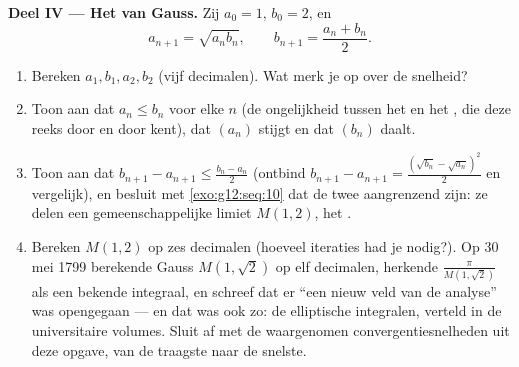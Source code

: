 \begin{problem}
\medskip
\noindent\textbf{Deel IV --- Het   van
Gauss.}
Zij $a_0 = 1$, $b_0 = 2$, en
\[
a_{n+1} = \sqrt{a_n b_n},
\qquad
b_{n+1} = \frac{a_n + b_n}{2} .
\]
\begin{enumerate}[resume]
  \item Bereken $a_1, b_1, a_2, b_2$ (vijf decimalen). Wat merk je op over de
        snelheid?
  \item Toon aan dat $a_n \leq b_n$ voor elke $n$ (de ongelijkheid tussen het
         en het  , die deze reeks door en door
        kent), dat $(a_n)$ stijgt en dat $(b_n)$ daalt.
  \item Toon aan dat $b_{n+1} - a_{n+1} \leq \frac{b_n - a_n}{2}$ (ontbind
        $b_{n+1} - a_{n+1} = \frac{(\sqrt{b_n} - \sqrt{a_n})^2}{2}$ en
        vergelijk), en besluit met \cref{exo:g12:seq:10} dat de twee 
        aangrenzend zijn: ze delen een gemeenschappelijke limiet $M(1, 2)$,
        het \emph{ }.
  \item Bereken $M(1, 2)$ op zes decimalen (hoeveel iteraties had je nodig?).
        Op 30 mei 1799 berekende Gauss $M(1, \sqrt2)$ op elf decimalen,
        herkende $\frac{\pi}{M(1,\sqrt2)}$ als een bekende integraal, en
        schreef dat er ``een nieuw veld van de analyse'' was opengegaan --- en
        dat was ook zo: de elliptische integralen, verteld in de universitaire
        volumes. Sluit af met de waargenomen convergentiesnelheden uit deze
        opgave, van de traagste naar de snelste.
\end{enumerate}
\end{problem}
